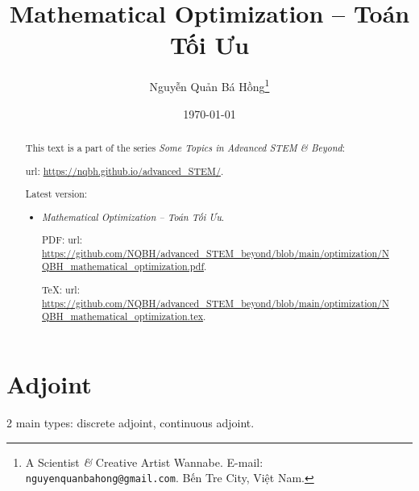 \documentclass{article}
\title{Mathematical Optimization -- Toán Tối Ưu}
\author{Nguyễn Quản Bá Hồng\footnote{A Scientist {\it\&} Creative Artist Wannabe. E-mail: {\tt nguyenquanbahong@gmail.com}. Bến Tre City, Việt Nam.}}
\date{\today}
\begin{document}
\maketitle
\begin{abstract}
	This text is a part of the series {\it Some Topics in Advanced STEM \& Beyond}:

	{\sc url}: \url{https://nqbh.github.io/advanced_STEM/}.

	Latest version:
	\begin{itemize}
		\item {\it Mathematical Optimization -- Toán Tối Ưu}.

		PDF: {\sc url}: \url{https://github.com/NQBH/advanced_STEM_beyond/blob/main/optimization/NQBH_mathematical_optimization.pdf}.

		\TeX: {\sc url}: \url{https://github.com/NQBH/advanced_STEM_beyond/blob/main/optimization/NQBH_mathematical_optimization.tex}.
	\end{itemize}
\end{abstract}
\tableofcontents


\section{Adjoint}
2 main types: discrete adjoint, continuous adjoint.
\end{document}
